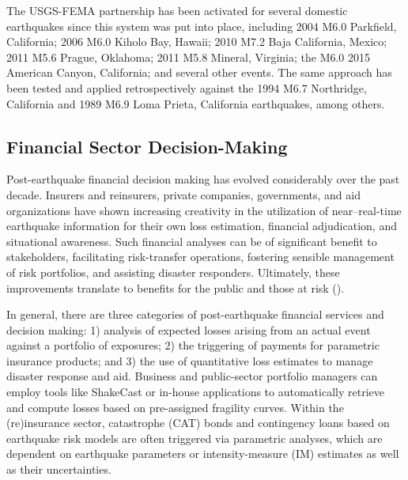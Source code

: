 \documentclass[letterpaper,10pt,english]{sphinxmanual}
\begin{document}
The USGS-FEMA partnership has been activated for several domestic earthquakes
since this system was put into place, including 2004 M6.0 Parkfield, California;
2006 M6.0 Kiholo Bay, Hawaii; 2010 M7.2 Baja California, Mexico; 2011 M5.6
Prague, Oklahoma; 2011 M5.8 Mineral, Virginia; the M6.0 2015 American Canyon,
California; and several other events. The same approach has been
tested and applied retrospectively against the 1994 M6.7 Northridge, California and 1989 M6.9
Loma Prieta, California earthquakes, among others.


\subsection{Financial Sector Decision-Making}
\label{shakemap_applications:financial-sector-decision-making}
Post-earthquake financial decision making has evolved considerably over the past
decade. Insurers and reinsurers, private companies, governments, and aid
organizations have shown increasing creativity in the utilization of
near--real-time earthquake information for their own loss estimation, financial
adjudication, and situational awareness. Such financial analyses can be of
significant benefit to stakeholders, facilitating risk-transfer operations,
fostering sensible management of risk portfolios, and assisting disaster
responders. Ultimately, these improvements translate to benefits for the public
and those at risk ({\hyperref[references:franco2015]{}}).

In general, there are three categories of post-earthquake financial services and
decision making: 1) analysis of expected losses arising from an actual event
against a portfolio of exposures; 2) the triggering of payments for parametric
insurance products; and 3) the use of quantitative loss estimates to manage
disaster response and aid. Business and public-sector portfolio managers can
employ tools like ShakeCast or in-house applications to automatically retrieve
and compute losses based on pre-assigned fragility curves. Within the
(re)insurance sector, catastrophe (CAT) bonds and contingency loans based on
earthquake risk models are often triggered via parametric analyses, which are
dependent on earthquake parameters or intensity-measure (IM) estimates as well
as their uncertainties.
\end{document}
